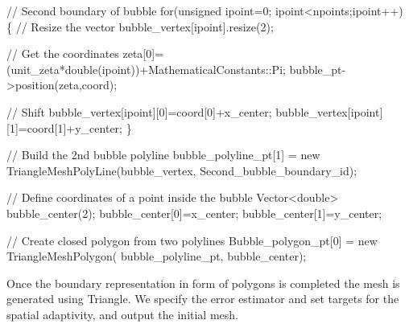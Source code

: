 \begin{DoxyCodeInclude}
 \textcolor{comment}{// Second boundary of bubble}
 \textcolor{keywordflow}{for}(\textcolor{keywordtype}{unsigned} ipoint=0; ipoint<npoints;ipoint++)
  \{
   \textcolor{comment}{// Resize the vector }
   bubble\_vertex[ipoint].resize(2);
   
   \textcolor{comment}{// Get the coordinates}
   zeta[0]=(unit\_zeta*double(ipoint))+MathematicalConstants::Pi;
   bubble\_pt->position(zeta,coord);

   \textcolor{comment}{// Shift}
   bubble\_vertex[ipoint][0]=coord[0]+x\_center;
   bubble\_vertex[ipoint][1]=coord[1]+y\_center;
  \}

 \textcolor{comment}{// Build the 2nd bubble polyline}
 bubble\_polyline\_pt[1] = \textcolor{keyword}{new} TriangleMeshPolyLine(bubble\_vertex,
                                                  Second\_bubble\_boundary\_id);


 \textcolor{comment}{// Define coordinates of a point inside the bubble}
 Vector<double> bubble\_center(2);
 bubble\_center[0]=x\_center;
 bubble\_center[1]=y\_center;
 
 
 \textcolor{comment}{// Create closed polygon from two polylines}
 Bubble\_polygon\_pt[0] = \textcolor{keyword}{new} TriangleMeshPolygon(
                 bubble\_polyline\_pt,
                 bubble\_center);

\end{DoxyCodeInclude}


Once the boundary representation in form of polygons is completed the mesh is generated using {\ttfamily Triangle}. We specify the error estimator and set targets for the spatial adaptivity, and output the initial mesh.


